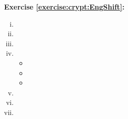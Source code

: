 \noindent\textbf{Exercise \ref{exercise:crypt:EngShift}:}
\begin{enumerate}[(i)]
\item
\item
\item
\item
\begin{itemize}
\item
\item
\item
\end{itemize}
\item
\item
\item
\end{enumerate}

